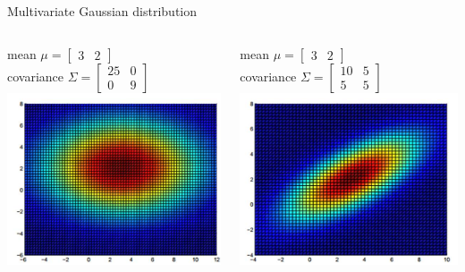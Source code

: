 \documentclass[compress]{beamer}
\begin{document}
\begin{frame}[label=sec-8-2]{Multivariate Gaussian distribution}
\begin{columns}[c] 
mean $\mu = \begin{bmatrix} 3 & 2 \end{bmatrix}$\\
covariance $\Sigma =  \begin{bmatrix} 25 & 0 \\ 0 & 9 \end{bmatrix}$
\includegraphics[width=0.8\linewidth]{MVN1}

mean $\mu = \begin{bmatrix} 3 & 2 \end{bmatrix}$\\
covariance $\Sigma =  \begin{bmatrix} 10 & 5 \\ 5 & 5 \end{bmatrix}$
\includegraphics[width=0.8\linewidth]{MVN2}
\end{columns}  
\end{frame}
\end{document}
